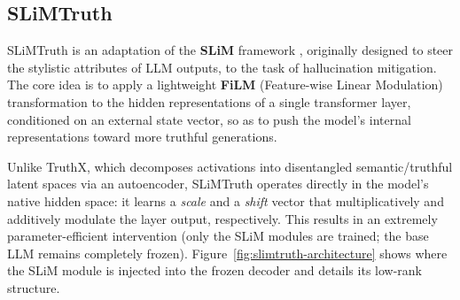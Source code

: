 \subsection{SLiMTruth}
SLiMTruth is an adaptation of the \textbf{SLiM} framework \cite{SLiM}, originally designed to steer the stylistic attributes of LLM outputs, to the task of hallucination mitigation. The core idea is to apply a lightweight \textbf{FiLM} (Feature-wise Linear Modulation) transformation to the hidden representations of a single transformer layer, conditioned on an external state vector, so as to push the model's internal representations toward more truthful generations.

Unlike TruthX, which decomposes activations into disentangled semantic/truthful latent spaces via an autoencoder, SLiMTruth operates directly in the model's native hidden space: it learns a \textit{scale} and a \textit{shift} vector that multiplicatively and additively modulate the layer output, respectively. This results in an extremely parameter-efficient intervention (only the SLiM modules are trained; the base LLM remains completely frozen). Figure~\ref{fig:slimtruth-architecture} shows where the SLiM module is injected into the frozen decoder and details its low-rank structure.

